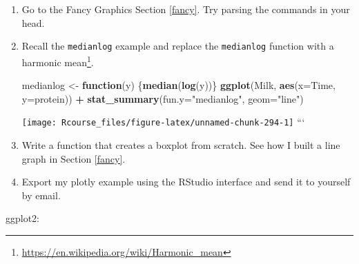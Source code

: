 \documentclass[]{book}
\newenvironment{Shaded}{\begin{snugshade}}{\end{snugshade}}
\newcommand{\ControlFlowTok}[1]{\textcolor[rgb]{0.13,0.29,0.53}{\textbf{#1}}}
\newcommand{\DataTypeTok}[1]{\textcolor[rgb]{0.13,0.29,0.53}{#1}}
\newcommand{\KeywordTok}[1]{\textcolor[rgb]{0.13,0.29,0.53}{\textbf{#1}}}
\newcommand{\NormalTok}[1]{#1}
\newcommand{\OperatorTok}[1]{\textcolor[rgb]{0.81,0.36,0.00}{\textbf{#1}}}
\newcommand{\StringTok}[1]{\textcolor[rgb]{0.31,0.60,0.02}{#1}}
\renewcommand{\href}[2]{#2\footnote{\url{#1}}}
\theoremstyle{definition}
\theoremstyle{definition}
\theoremstyle{definition}
\theoremstyle{remark}
\begin{document}
\begin{enumerate}
\def\labelenumi{\arabic{enumi}.}
\item
  Go to the Fancy Graphics Section \ref{fancy}. Try parsing the commands in your head.
\item
  Recall the \texttt{medianlog} example and replace the \texttt{medianlog} function with a \href{https://en.wikipedia.org/wiki/Harmonic_mean}{harmonic mean}.

\begin{Shaded}
\begin{Highlighting}[]
\NormalTok{medianlog <-}\StringTok{ }\ControlFlowTok{function}\NormalTok{(y) \{}\KeywordTok{median}\NormalTok{(}\KeywordTok{log}\NormalTok{(y))\}}
\KeywordTok{ggplot}\NormalTok{(Milk, }\KeywordTok{aes}\NormalTok{(}\DataTypeTok{x=}\NormalTok{Time, }\DataTypeTok{y=}\NormalTok{protein)) }\OperatorTok{+}
\StringTok{  }\KeywordTok{stat_summary}\NormalTok{(}\DataTypeTok{fun.y=}\StringTok{"medianlog"}\NormalTok{, }\DataTypeTok{geom=}\StringTok{"line"}\NormalTok{)}
\end{Highlighting}
\end{Shaded}

  \texttt{[image: Rcourse\_files/figure-latex/unnamed-chunk-294-1]}
  ```
\item
  Write a function that creates a boxplot from scratch. See how I built a line graph in Section \ref{fancy}.
\item
  Export my plotly example using the RStudio interface and send it to yourself by email.
\end{enumerate}

ggplot2:
\end{document}
